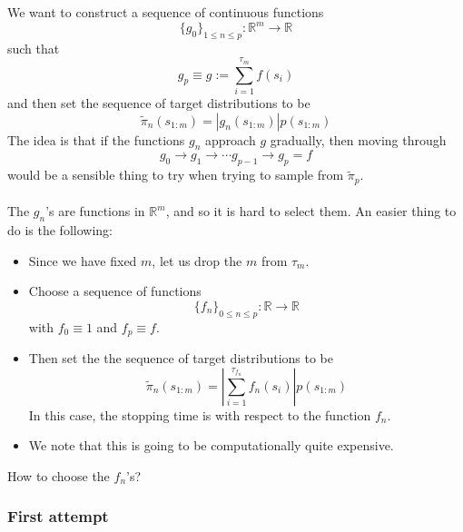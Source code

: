 \documentclass{article}
\begin{document}
We want to construct a sequence of continuous functions 
$$\{ g_{0} \}_{1 \leq n \leq p}: \mathbb{R}^{m} \rightarrow \mathbb{R}$$ 
such that 
$$ g_{p} \equiv g := \sum_{i=1}^{\tau_{m}} f(s_{i}) $$ 
and then set the sequence of target distributions to be 
$$ \tilde{\pi}_{n}(s_{1:m}) = | g_{n}(s_{1:m}) | p(s_{1:m}) $$
The idea is that if the functions $g_{n}$ approach $g$ gradually, then moving through 
$$g_{0} \rightarrow g_{1} \rightarrow \cdots g_{p-1} \rightarrow g_{p} = f $$ 
would be a sensible thing to try when trying to sample from $\tilde{\pi}_{p}$. 
\\ \\
The $g_{n}$'s are functions in $\mathbb{R}^{m}$, and so it is hard to select them. An easier thing to do is the following: 

\begin{itemize}

\item Since we have fixed $m$, let us drop the $m$ from $\tau_{m}$.
\item Choose a sequence of functions 
$$ \{ f_{n} \}_{0 \leq n \leq p }: \mathbb{R} \rightarrow \mathbb{R} $$
with $ f_{0} \equiv 1$ and $f_{p} \equiv f$.
\item Then set the the sequence of target distributions to be 
$$ \tilde{\pi}_{n}(s_{1:m}) = \left | \sum_{i=1}^{\tau_{f_{n}}} f_{n} (s_{i}) \right | p(s_{1:m}) $$
In this case, the stopping time is with respect to the function $f_{n}$.
\item We note that this is going to be computationally quite expensive.
\end{itemize}
How to choose the $f_{n}$'s? 
\subsubsection{First attempt} 
\end{document}
